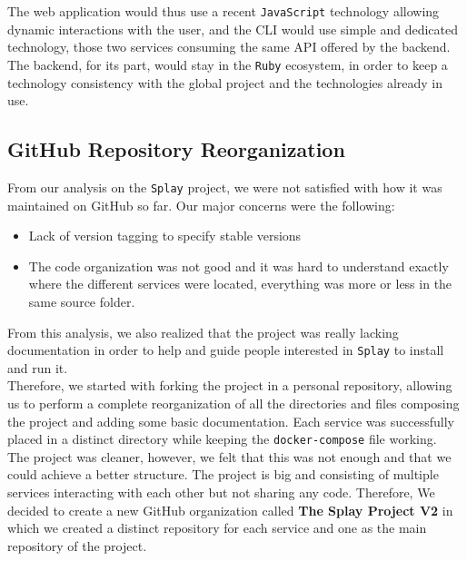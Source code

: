 \documentclass{eplmastersthesis}
\begin{document}
        The web application would thus use a recent \texttt{JavaScript} technology
        allowing dynamic interactions with the user, and the CLI would use
        simple and dedicated technology, those two services consuming the
        same API offered by the backend. The backend, for its part, would
        stay in the \texttt{Ruby} ecosystem, in order to keep a technology consistency
        with the global project and the technologies already in use.

      \subsection{GitHub Repository Reorganization}

        From our analysis on the \texttt{Splay} project, we were not satisfied with how
        it was maintained on GitHub so far. Our major concerns were the
        following:

        \begin{itemize}
          \item Lack of version tagging to specify stable versions
          \item The code organization was not good and it was hard to
          understand exactly where the different services were located,
          everything was more or less in the same source folder.
        \end{itemize}

        From this analysis, we also realized that the project was really
        lacking documentation in order to help and guide people interested
        in \texttt{Splay} to install and run it.\\

        Therefore, we started with forking the project in a personal repository,
        allowing us to perform a complete reorganization of all the directories
        and files composing the project and adding some basic documentation.
        Each service was successfully placed in a distinct directory while
        keeping the \texttt{docker-compose} file working.\\
        The project was cleaner, however, we felt that this was not enough
        and that we could achieve a better structure. The project is big and
        consisting of multiple services interacting with each other but
        not sharing any code. Therefore, We decided to create a new GitHub
        organization called \textbf{The Splay Project V2} in which we created
        a distinct repository for each service and one as the main repository
        of the project.\\
\end{document}
